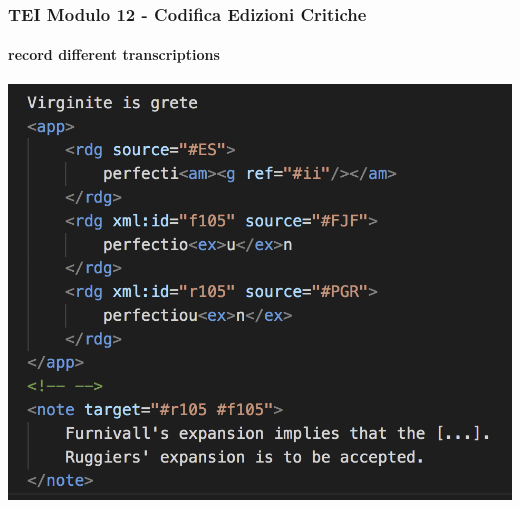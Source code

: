 \begin{frame}
    \frametitle{TEI Modulo 12 - Codifica Edizioni Critiche}
    \framesubtitle{record different transcriptions}
    \addtocounter{nframe}{1}
    



    \begin{center}
       \includegraphics[width=.85\textwidth]{imgs/app-trascrizion-note.png}
    \end{center}

\end{frame}



